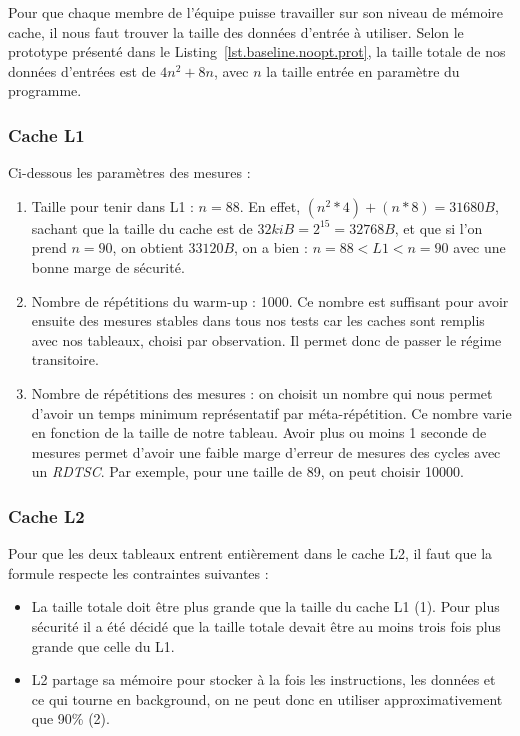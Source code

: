 \documentclass[12pt,a4paper]{article}
\begin{document}
Pour que chaque membre de l'équipe puisse travailler sur son niveau de mémoire
cache, il nous faut trouver la taille des données d'entrée à utiliser. Selon le
prototype présenté dans le Listing~\ref{lst.baseline.noopt.prot}, la taille
totale de nos données d'entrées est de $4n^2 + 8n$, avec $n$ la taille entrée
en paramètre du programme.

\subsubsection{Cache L1}

Ci-dessous les paramètres des mesures :
\begin{enumerate}[(1)]
    \item Taille pour tenir dans L1 : $n = 88$.
        En effet, $(n^2 * 4) + (n * 8) = 31680 B$, sachant que la taille du
        cache est de $32 kiB = 2^{15} = 32768 B$, et que si l'on prend $n =
        90$, on obtient $33120 B$, on a bien : $n = 88 < L1 < n = 90$ avec une
        bonne marge de sécurité.
    \item Nombre de répétitions du warm-up : 1000. Ce nombre est suffisant pour
        avoir ensuite des mesures stables dans tous nos tests car les caches
        sont remplis avec nos tableaux, choisi par observation. Il permet donc
        de passer le régime transitoire.
    \item Nombre de répétitions des mesures : on choisit un nombre qui nous
        permet d'avoir un temps minimum représentatif par méta-répétition. Ce
        nombre varie en fonction de la taille de notre tableau. Avoir plus ou
        moins 1 seconde de mesures permet d'avoir une faible marge d'erreur de
        mesures des cycles avec un \textit{RDTSC}. Par exemple, pour une taille
        de 89, on peut choisir 10000.
\end{enumerate}

\subsubsection{Cache L2}

Pour que les deux tableaux entrent entièrement dans le cache L2, il faut 
que la formule respecte les contraintes suivantes : 
\begin{itemize}
    \item La taille totale doit être plus grande que la taille du cache 
    L1 (1). Pour plus sécurité il a été décidé que la taille totale devait 
    être au moins trois fois plus grande que celle du L1.
    \item L2 partage sa mémoire pour stocker à la fois les instructions, 
    les données et ce qui tourne en background, on ne peut donc en utiliser 
    approximativement que 90\% (2). 
\end{itemize}
\end{document}
